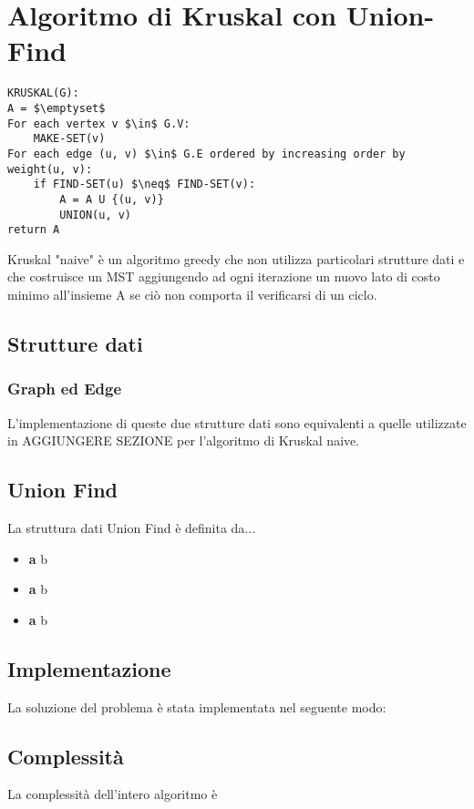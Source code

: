 \section{Algoritmo di Kruskal con Union-Find}

\begin{lstlisting}[mathescape=true]
KRUSKAL(G):
A = $\emptyset$
For each vertex v $\in$ G.V:
	MAKE-SET(v)
For each edge (u, v) $\in$ G.E ordered by increasing order by weight(u, v):
	if FIND-SET(u) $\neq$ FIND-SET(v):       
		A = A U {(u, v)}
		UNION(u, v)
return A
\end{lstlisting}

Kruskal "naive" è un algoritmo greedy che non utilizza particolari strutture dati e che costruisce un MST aggiungendo ad ogni iterazione un nuovo lato di costo minimo all'insieme A se ciò non comporta il verificarsi di un ciclo.

\subsection{Strutture dati}

	\subsubsection{Graph ed Edge}
		L'implementazione di queste due strutture dati sono equivalenti a quelle utilizzate in AGGIUNGERE SEZIONE per l'algoritmo di Kruskal naive.

	\subsection{Union Find}
		La struttura dati Union Find è definita da...
		
		\begin{itemize}
			\item \textbf{a} b
			\item \textbf{a} b
			\item \textbf{a} b
		\end{itemize}

\subsection{Implementazione}
	La soluzione del problema è stata implementata nel seguente modo:

\subsection{Complessità}
	La complessità dell'intero algoritmo è 

\pagebreak